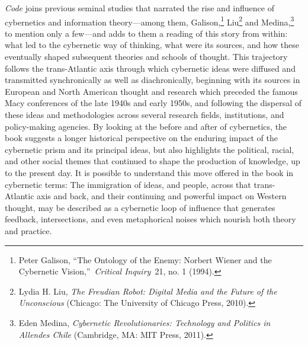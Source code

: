 \documentclass{tufte-handout}
\begin{document}
\noindent \emph{Code} joins previous seminal studies that narrated the rise and
influence of cybernetics and information theory---among them,
Galison,\footnote{Peter Galison, ``The Ontology of the Enemy: Norbert
  Wiener and the Cybernetic Vision,''~\emph{Critical Inquiry}~21, no. 1
  (1994).} Liu\footnote{Lydia H. Liu, \emph{The Freudian Robot: Digital
  Media and the Future of the Unconscious} (Chicago: The University of
  Chicago Press, 2010).} and Medina,\footnote{Eden Medina,
  \emph{Cybernetic Revolutionaries: Technology and Politics in
  Allende\textquotesingle s Chile} (Cambridge, MA: MIT Press, 2011).} to
mention only a few---and adds to them a reading of this story from
within: what led to the cybernetic way of thinking, what were its
sources, and how these eventually shaped subsequent theories and schools
of thought. This trajectory follows the trans-Atlantic axis through
which cybernetic ideas were diffused and transmitted synchronically as
well as diachronically, beginning with its sources in European and North
American thought and research which preceded the famous Macy conferences
of the late 1940s and early 1950s, and following the dispersal of these
ideas and methodologies across several research fields, institutions,
and policy-making agencies. By looking at the before and after of
cybernetics, the book suggests a longer historical perspective on the
enduring impact of the cybernetic prism and its principal ideas, but
also highlights the political, racial, and other social themes that
continued to shape the production of knowledge, up to the present day.
It is possible to understand this move offered in the book in cybernetic
terms: The immigration of ideas, and people, across that trans-Atlantic
axis and back, and their continuing and powerful impact on Western
thought, may be described as a cybernetic loop of influence that
generates feedback, intersections, and even metaphorical noises which
nourish both theory and practice.
\end{document}
